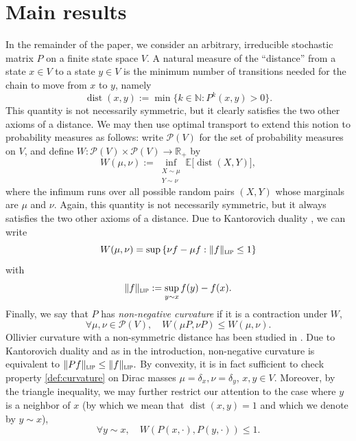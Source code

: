 \documentclass[JEP,XML,SOM,Unicode,NoEqCountersInSection,published]{cedram}
\theoremstyle{definition}
\newcommand{\dN}{\mathbb {N}}
\newcommand{\dR}{\mathbb {R}}
\newcommand{\EE}{{\mathbb{E}}}
\newcommand{\cP}{\mathcal{P}}
\newcommand{\lip}{\textup{\textsc{lip}}}
\DeclareMathOperator{\dist}{dist}
\begin{document}
\section{Main results}
\label{sec:main}

In the remainder of the paper, we consider an arbitrary, irreducible stochastic matrix $P$ on a finite state space $V$. A natural measure of the ``distance'' from a state $x\in V$ to a state $y\in V$ is the minimum number of transitions needed for the chain to move from $x$ to $y$, namely
\begin{equation*}
\dist(x,y) := \min\{k\in\dN\colon P^k(x,y)>0\}.
\end{equation*}
This quantity is not necessarily symmetric, but it clearly satisfies the two other axioms of a distance. We may then use optimal transport to extend this notion to probability measures as follows: write $\cP(V)$ for the set of probability measures on $V$, and define $W\colon \cP(V)\times\cP(V)\to\dR_+$ by
\begin{equation*}
W(\mu,\nu) := \inf_{\substack{X\sim\mu\\Y\sim\nu}}
\EE\bigl[\dist(X,Y)\bigr],
\end{equation*}
where the infimum runs over all possible random pairs $(X,Y)$ whose marginals are $\mu$ and $\nu$. Again, this quantity is not necessarily symmetric, but it always satisfies the two other axioms of a distance.
Due to Kantorovich duality \cite[Th.\,5.10 \& Particular Case 5.4]{villani2009optimal}, we can write
\[
W(\mu,\nu) = \sup \left\{ \nu f - \mu f : \|f\|_{\lip} \leq 1 \right\}
\]
with
\[
\|f\|_\lip := \sup_{y\sim x} f(y)-f(x).
\]
Finally, we say that $P$ has \emph{non-negative curvature} if it is a contraction under $W$, \ie
\begin{equation}
\label{def:curvature}
\forall \mu,\nu\in\cP(V),\quad
W(\mu P,\nu P) \le W(\mu,\nu).
\end{equation}
Ollivier curvature with a non-symmetric distance has been studied in \cite{yamada2016ricci,ozawa2020geometric,eidi2020ollivierJournal,ozawa2022heat}.
Due to Kantorovich duality and as in the introduction, non-negative curvature is equivalent to
$
\|Pf\|_\lip \leq \|f\|_\lip.
$
By convexity, it is in fact sufficient to check property \eqref{def:curvature} on Dirac masses $\mu=\delta_x,\nu=\delta_y$, $x,y\in V$. Moreover, by the triangle inequality, we may further restrict our attention to the case where $y$ is a neighbor of $x$ (by which we mean that $\dist(x,y)=1$ and which we denote by $y\sim x$), \ie
\begin{equation}
\label{def:local}
\forall y\sim x, \quad
W\left(P(x,\cdot),P(y,\cdot)\right) \le 1.
\end{equation}
\end{document}

